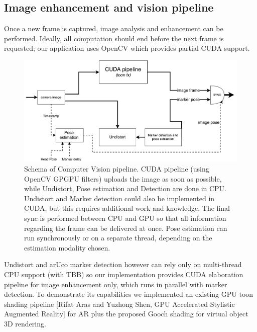 
\subsection{Image enhancement and vision pipeline}
Once a new frame is captured, image analysis and enhancement can be performed. Ideally, all computation should end before the next frame is requested; our application uses OpenCV which provides partial CUDA support.

\begin{figure}[h!]
\centering
\includegraphics[width=\linewidth]{schemas/vision-schema}
\caption{Schema of Computer Vision pipeline. CUDA pipeline (using OpenCV GPGPU filters) uploads the image as soon as possible, while Undistort, Pose estimation and Detection are done in CPU. Undistort and Marker detection could also be implemented in CUDA, but this requires additional work and knowledge. The final sync is performed between CPU and GPU so that all information regarding the frame can be delivered at once. Pose estimation can run synchronously or on a separate thread, depending on the estimation modality chosen.}
\label{fig:vision_architecture}
\end{figure}

Undistort and arUco marker detection however can rely only on multi-thread CPU support (with TBB) so our implementation provides CUDA elaboration pipeline for image enhancement only, which runs in parallel with marker detection. To demonstrate its capabilities we implemented an existing GPU toon shading pipeline [Rifat Aras and Yuzhong Shen, GPU Accelerated Stylistic Augmented Reality] for AR plus the proposed Gooch shading for virtual object 3D rendering.

